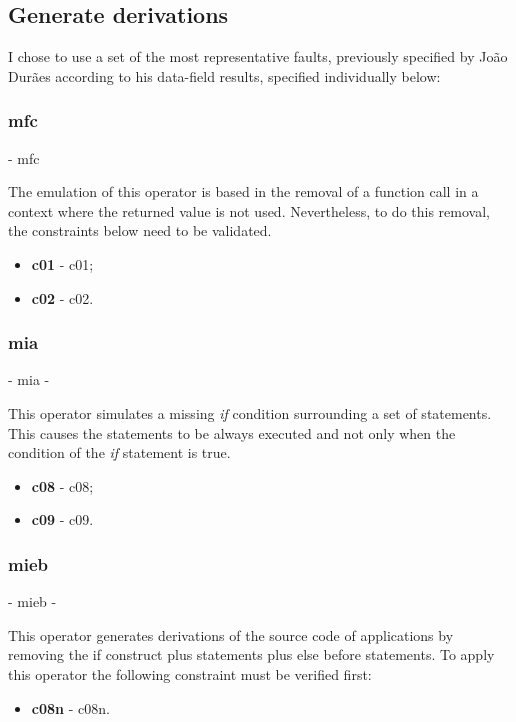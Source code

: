\clearpage
\subsection{Generate derivations}

I chose to use a set of the most representative faults, previously specified by João Durães\cite{duraes2006emulation} according to his data-field results, specified individually below:

	\subsubsection{\textbf{\acs{mfc}}} - \Acl{mfc}

	The emulation of this operator is based in the removal of a function call in a context where the returned value is not used. Nevertheless, to do this removal, the constraints below need to be validated.
	\begin{itemize}
		\item \textbf{\acs{c01}} - \Acl{c01};
		\item \textbf{\acs{c02}} - \Acl{c02}.
	\end{itemize}

	\subsubsection{\textbf{\acs{mia}}} - \Acl{mia} - 

	This operator simulates a missing \textit{if} condition surrounding a set of statements. This causes the statements to be always executed and not only when the condition of the \textit{if} statement is true.
	\begin{itemize}
		\item \textbf{\acs{c08}} - \Acl{c08};
		\item \textbf{\acs{c09}} - \Acl{c09}.
	\end{itemize}

	\subsubsection{\textbf{\acs{mieb}}} - \Acl{mieb} - 

	This operator generates derivations of the source code of applications by removing the if construct plus statements plus else before statements. To apply this operator the following constraint must be verified first:
	\begin{itemize}
		\item \textbf{\acs{c08n}} - \Acl{c08n}.
	\end{itemize}

